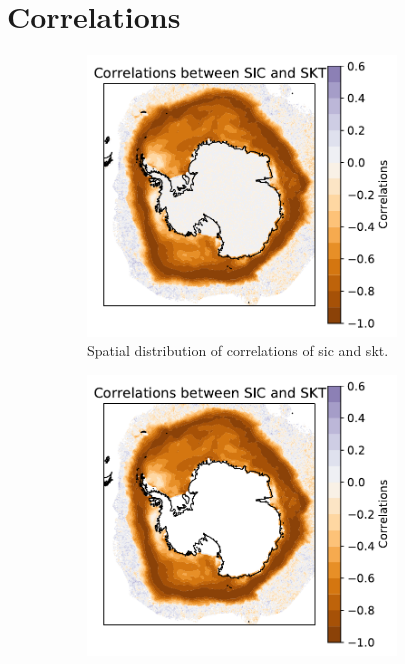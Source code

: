 \documentclass[../main.tex]{subfiles}
\begin{document}
\section{Correlations}
\label{sec:correlations_temp_ice}

\begin{figure}[ht!]
\centering
\begin{subfigure}[ht!]{0.49\textwidth}
\centering
\includegraphics[width=0.9\textwidth]{images/week8/hres/corr_sic_skt_longterm_spatial}
\caption{Spatial distribution of correlations of \gls{sic} and \gls{skt}.}
\end{subfigure}
\begin{subfigure}[ht!]{0.49\textwidth}
\centering
\includegraphics[width=0.9\textwidth]{images/week8/hres/corr_sic_skt_longterm_spatial_anmomalous}

\end{subfigure}
\end{figure}
\end{document}
